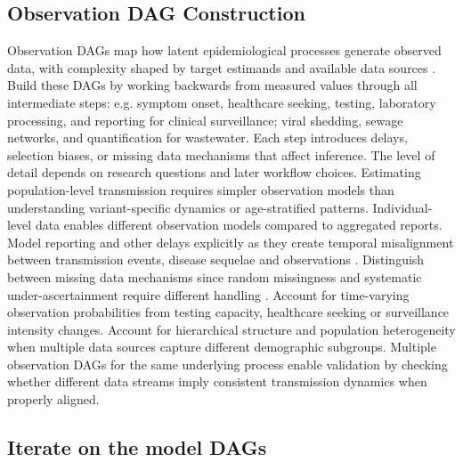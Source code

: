 \documentclass{article}
\begin{document}
\subsection{Observation DAG Construction} \label{sec:observation}

Observation DAGs map how latent epidemiological processes generate observed data, with complexity shaped by target estimands and available data sources \citep{deangelis2018analysing}.
Build these DAGs by working backwards from measured values through all intermediate steps: e.g. symptom onset, healthcare seeking, testing, laboratory processing, and reporting for clinical surveillance; viral shedding, sewage networks, and quantification for wastewater.
Each step introduces delays, selection biases, or missing data mechanisms that affect inference.
The level of detail depends on research questions and later workflow choices.
Estimating population-level transmission requires simpler observation models than understanding variant-specific dynamics or age-stratified patterns.
Individual-level data enables different observation models compared to aggregated reports.
Model reporting and other delays explicitly as they create temporal misalignment between transmission events, disease sequelae and observations \citep{seaman2022nowcasting}.
Distinguish between missing data mechanisms since random missingness and systematic under-ascertainment require different handling \citep{sherratt2021exploring}.
Account for time-varying observation probabilities from testing capacity, healthcare seeking or surveillance intensity changes.
Account for hierarchical structure and population heterogeneity when multiple data sources capture different demographic subgroups.
Multiple observation DAGs for the same underlying process enable validation by checking whether different data streams imply consistent transmission dynamics when properly aligned.

\subsection{Iterate on the model DAGs}
\end{document}
